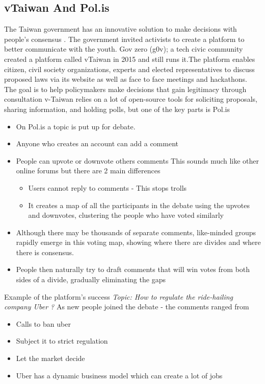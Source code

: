 \documentclass[12pt, conference, a4paper]{article}
\begin{document}
\subsection{vTaiwan And Pol.is}
The Taiwan government has an innovative solution to make decisions with people’s consensus \cite{polis}. The government invited activists to create a platform to better communicate with the youth. Gov zero (g0v); a tech civic community created a platform called vTaiwan in 2015 and still runs it.The platform enables citizen, civil society organizations, experts and elected representatives to discuss proposed laws via its website as well as face to face meetings and hackathons. The goal is to help policymakers make decisions that gain legitimacy through consultation
v-Taiwan relies on a lot of open-source tools for soliciting proposals, sharing information, and holding polls, but one of the key parts is Pol.is
\begin{itemize}
\item On Pol.is a topic is put up for debate.
\item Anyone who creates an account can add a comment
\item People can upvote or downvote others comments
This sounds much like other online forums but there are 2 main differences
  \begin{itemize}
    \item Users cannot reply to comments - This stops trolls
    \item It creates a map of all the participants in the debate using the upvotes and downvotes, clustering the people who have voted similarly
  \end{itemize}
\item Although there may be thousands of separate comments, like-minded groups rapidly emerge in this voting map, showing where there are divides and where there is consensus.
\item People then naturally try to draft comments that will win votes from both sides of a divide, gradually eliminating the gaps
\end{itemize}
Example of the platform's success
\textit{Topic: How to regulate the ride-hailing company Uber ?}
As new people joined the debate - the comments ranged from
\begin{itemize}
\item Calls to ban uber
\item Subject it to strict regulation
\item Let the market decide
\item Uber has a dynamic business model which can create a lot of jobs
\end{itemize}
\end{document}
